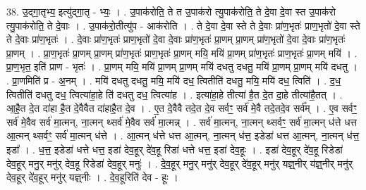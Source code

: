 \documentclass[17pt]{extarticle}
\begin{document}
38. उ॒द्‍गा॒तृभ्य॒ इत्यु॑द्‍गा॒तृ - भ्यः॒ । . उ॒पाक॑रोति॒ ते त उ॒पाक॑रो त्यु॒पाक॑रोति॒ ते दे॒वा दे॒वा स्त उ॒पाक॑रो त्यु॒पाक॑रोति॒ ते दे॒वाः । . उ॒पाक॑रो॒तीत्यु॑प - आक॑रोति । . ते दे॒वा दे॒वा स्ते ते दे॒वाः प्रा॑ण॒भृतः॑ प्राण॒भृतो॑ दे॒वा स्ते ते दे॒वाः प्रा॑ण॒भृतः॑ । . दे॒वाः प्रा॑ण॒भृतः॑ प्राण॒भृतो॑ दे॒वा दे॒वाः प्रा॑ण॒भृतः॑ प्रा॒णम् प्रा॒णम् प्रा॑ण॒भृतो॑ दे॒वा दे॒वाः प्रा॑ण॒भृतः॑ प्रा॒णम् । . प्रा॒ण॒भृतः॑ प्रा॒णम् प्रा॒णम् प्रा॑ण॒भृतः॑ प्राण॒भृतः॑ प्रा॒णम् मयि॒ मयि॑ प्रा॒णम् प्रा॑ण॒भृतः॑ प्राण॒भृतः॑ प्रा॒णम् मयि॑ । . प्रा॒ण॒भृत॒ इति॑ प्राण - भृतः॑ । . प्रा॒णम् मयि॒ मयि॑ प्रा॒णम् प्रा॒णम् मयि॑ दधतु दधतु॒ मयि॑ प्रा॒णम् प्रा॒णम् मयि॑ दधतु । . प्रा॒णमिति॑ प्र - अ॒नम् । . मयि॑ दधतु दधतु॒ मयि॒ मयि॑ दध॒ त्वितीति॑ दधतु॒ मयि॒ मयि॑ दध॒ त्विति॑ । . द॒ध॒ त्वितीति॑ दधतु दध॒ त्वित्या॑हा॒हे ति॑ दधतु दध॒ त्वित्या॑ह । . इत्या॑हा॒हे तीत्या॑ है॒त दे॒त दा॒हे तीत्या॑है॒तत् । . आ॒है॒त दे॒त दा॑हा है॒त दे॒वैवैत दा॑हाहै॒त दे॒व । . ए॒त दे॒वैवै तदे॒त दे॒व सर्वꣳ॒॒ सर्व॑ मे॒वै तदे॒तदे॒व सर्व᳚म् । . ए॒व सर्वꣳ॒॒ सर्व॑ मे॒वैव सर्व॑ मा॒त्मन्, ना॒त्मन् थ्सर्व॑ मे॒वैव सर्व॑ मा॒त्मन्न् । . सर्व॑ मा॒त्मन्, ना॒त्मन् थ्सर्वꣳ॒॒ सर्व॑ मा॒त्मन् ध॑त्ते धत्त आ॒त्मन् थ्सर्वꣳ॒॒ सर्व॑ मा॒त्मन् ध॑त्ते । . आ॒त्मन् ध॑त्ते धत्त आ॒त्मन्, ना॒त्मन् ध॑त्त॒ इडेडा॑ धत्त आ॒त्मन्, ना॒त्मन् ध॑त्त॒ इडा᳚ । . ध॒त्त॒ इडेडा॑ धत्ते धत्त॒ इडा॑ देव॒हूर् दे॑व॒हू रिडा॑ धत्ते धत्त॒ इडा॑ देव॒हूः । . इडा॑ देव॒हूर् दे॑व॒हू रिडेडा॑ देव॒हूर् मनु॒र् मनु॑र् देव॒हू रिडेडा॑ देव॒हूर् मनुः॑ । . दे॒व॒हूर् मनु॒र् मनु॑र् देव॒हूर् दे॑व॒हूर् मनु॑र् यज्ञ्॒नीर् य॑ज्ञ्॒नीर् मनु॑र् देव॒हूर् दे॑व॒हूर् मनु॑र् यज्ञ्॒नीः । . दे॒व॒हूरिति॑ देव - हूः । \newline
\end{document}
